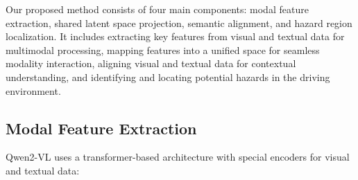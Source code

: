 


Our proposed method consists of four main components: modal feature extraction, shared latent space projection, semantic alignment, and hazard region localization. It includes extracting key features from visual and textual data for multimodal processing, mapping features into a unified space for seamless modality interaction, aligning visual and textual data for contextual understanding, and identifying and locating potential hazards in the driving environment. 


\subsection{Modal Feature Extraction}
Qwen2-VL uses a transformer-based architecture with special encoders for visual and textual data:

